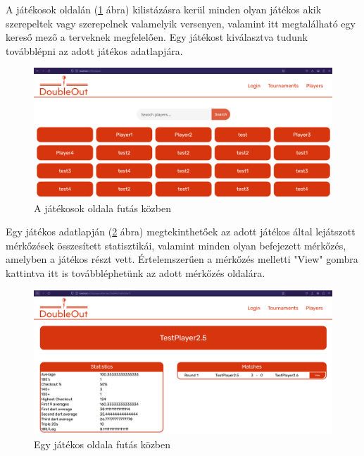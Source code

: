 A játékosok oldalán (\ref{fig:playersTest} ábra) kilistázásra kerül minden olyan játékos akik szerepeltek vagy szerepelnek valamelyik versenyen, valamint itt megtalálható egy kereső mező a terveknek megfelelően. Egy játékost kiválasztva tudunk továbblépni az adott játékos adatlapjára. 

\begin{figure}[h]
\centering
\includegraphics[scale=0.3]{images/PlayersTest.png}
\caption{A játékosok oldala futás közben}
\label{fig:playersTest}
\end{figure}

Egy játékos adatlapján (\ref{fig:playerTest} ábra) megtekinthetőek az adott játékos által lejátszott mérkőzések összesített statisztikái, valamint minden olyan befejezett mérkőzés, amelyben a játékos részt vett. Értelemszerűen a mérkőzés melletti "View" gombra kattintva itt is továbbléphetünk az adott mérkőzés oldalára.

\begin{figure}[h]
\centering
\includegraphics[scale=0.3]{images/PlayerTest.png}
\caption{Egy játékos oldala futás közben}
\label{fig:playerTest}
\end{figure}